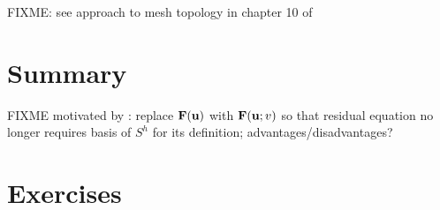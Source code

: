 FIXME: see approach to mesh topology in chapter 10 of \citep{Loggetal2012}


\section{Summary}

FIXME motivated by \citep{Loggetal2012}: replace $\mathbf{F}(\mathbf{u})$ with $\mathbf{F}(\mathbf{u};v)$ so that residual equation no longer requires basis of $S^h$ for its definition; advantages/disadvantages?


\section{Exercises}

\renewcommand{\labelenumi}{\arabic{chapter}.\arabic{enumi}\quad}
\renewcommand{\labelenumii}{(\alph{enumii})}
